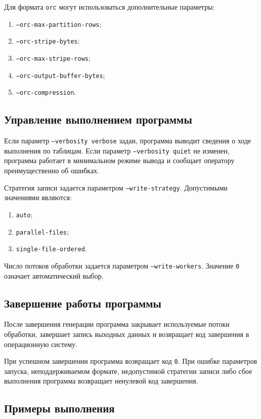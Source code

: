 Для формата \texttt{orc} могут использоваться дополнительные параметры:
\begin{enumerate}
    \item \texttt{--orc-max-partition-rows};
    \item \texttt{--orc-stripe-bytes};
    \item \texttt{--orc-max-stripe-rows};
    \item \texttt{--orc-output-buffer-bytes};
    \item \texttt{--orc-compression}.
\end{enumerate}

\subsection{Управление выполнением программы}

Если параметр \texttt{--verbosity verbose} задан, программа выводит сведения о ходе
выполнения по таблицам. Если параметр \texttt{--verbosity quiet} не изменен, программа
работает в минимальном режиме вывода и сообщает оператору преимущественно об
ошибках.

Стратегия записи задается параметром \texttt{--write-strategy}. Допустимыми значениями
являются:
\begin{enumerate}
    \item \texttt{auto};
    \item \texttt{parallel-files};
    \item \texttt{single-file-ordered}.
\end{enumerate}

Число потоков обработки задается параметром \texttt{--write-workers}. Значение \texttt{0}
означает автоматический выбор.

\subsection{Завершение работы программы}

После завершения генерации программа закрывает используемые потоки обработки,
завершает запись выходных данных и возвращает код завершения в операционную
систему.

При успешном завершении программа возвращает код \texttt{0}. При ошибке параметров
запуска, неподдерживаемом формате, недопустимой стратегии записи либо сбое
выполнения программа возвращает ненулевой код завершения.

\subsection{Примеры выполнения}

